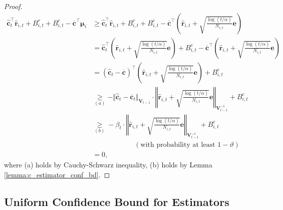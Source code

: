 \begin{proof}
\begin{equation}
\begin{aligned}  
\label{eq: c_hidden_confidence_upper_bd2}
\boldsymbol{\hat{c}}_t^{\top} \boldsymbol{\hat{r}}_{i,t} + B_{i,t}^{r} + B_{i,t}^{c} -\boldsymbol{\overline{c}}^{\top} \boldsymbol{\mu}_{i} 
& \geq
\boldsymbol{\hat{c}}_t^{\top} \boldsymbol{\hat{r}}_{i,t} + B_{i,t}^{r} + B_{i,t}^{c} - \boldsymbol{\overline{c}}^{\top} \left( \boldsymbol{\hat{r}}_{i,t} + \sqrt{\frac{ \log(t/\alpha)}{N_{i,t}}} \boldsymbol{e} \right)  \\
& =
\boldsymbol{\hat{c}}_t^{\top} \left( \boldsymbol{\hat{r}}_{i,t} + \sqrt{\frac{ \log(t/\alpha)}{N_{i,t}}} \boldsymbol{e} \right) + B_{i,t}^{c} - \boldsymbol{\overline{c}}^{\top} \left( \boldsymbol{\hat{r}}_{i,t} + \sqrt{\frac{ \log(t/\alpha)}{N_{i,t}}} \boldsymbol{e} \right)  \\
& = 
(\boldsymbol{\hat{c}}_t - \boldsymbol{\overline{c}})^{\top}
\left( \boldsymbol{\hat{r}}_{i,t} + \sqrt{\frac{ \log(t/\alpha)}{N_{i,t}}} \boldsymbol{e} \right) + B_{i,t}^{c} \\
& \underset{(a)}{\geq}
- \Vert \boldsymbol{\hat{c}}_t - \boldsymbol{\overline{c}}_t \Vert_{\boldsymbol{V}_{t-1}} \cdot \left\Vert \boldsymbol{\hat{r}}_{i,t} + \sqrt{\frac{ \log(t/\alpha)}{N_{i,t}}} \boldsymbol{e} \right\Vert_{\boldsymbol{V}_{t-1}^{-1}} 
+
B_{i,t}^{c} \\
& \underset{(b)}{\geq}
- \beta_t \cdot \left\Vert \boldsymbol{\hat{r}}_{i,t} + \sqrt{\frac{ \log(t/\alpha)}{N_{i,t}}} \boldsymbol{e} \right\Vert_{\boldsymbol{V}_{t-1}^{-1}} 
+
B_{i,t}^{c} \\
& \qquad \qquad \qquad (\text{with probability at least } 1-\vartheta) \\
& = 0,
\end{aligned}
\end{equation}
where (a) holds by Cauchy-Schwarz inequality, (b) holds by Lemma \ref{lemma:c_estimator_conf_bd}. 
\end{proof}


\subsection{Uniform Confidence Bound for Estimators}
\label{sec: proof_proposition_uniform_confidence_bound}




